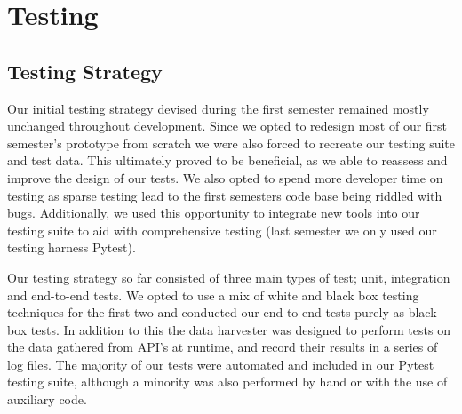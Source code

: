 \documentclass[main.tex]{subfiles}
\begin{document}
\section{Testing}
\label{Testing}

\subsection{Testing Strategy}

Our initial testing strategy devised during the first semester remained mostly unchanged throughout development. Since we opted to redesign most of our first semester’s prototype from scratch we were also forced to recreate our testing suite and test data. This ultimately proved to be beneficial, as we able to reassess and improve the design of our tests. We also opted to spend more developer time on testing as sparse testing lead to the first semesters code base being riddled with bugs. Additionally, we used this opportunity to integrate new tools into our testing suite to aid with comprehensive testing (last semester we only used our testing harness Pytest).

Our testing strategy so far consisted of three main types of test; unit, integration and end-to-end tests. We opted to use a mix of white and black box testing techniques for the first two and conducted our end to end tests purely as black-box tests. In addition to this the data harvester was designed to perform tests on the data gathered from API's at runtime, and record their results in a series of log files. The majority of our tests were automated and included in our Pytest testing suite, although a minority was also performed by hand or with the use of auxiliary code.
\end{document}
